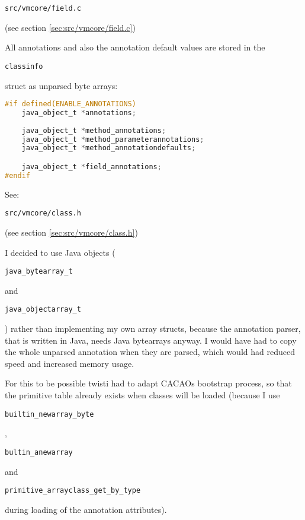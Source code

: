 \documentclass[a4paper, 10pt, titlepage]{scrartcl} %
\begin{document}
\begin{scriptsize}\verb|src|\hspace{0.0pt}\verb|/|\hspace{0.0pt}\verb|vmcore|\hspace{0.0pt}\verb|/|\hspace{0.0pt}\verb|field|\hspace{0.0pt}\verb|.|\hspace{0.0pt}\verb|c|\end{scriptsize} (see section \ref{sec:src/vmcore/field.c})

All annotations and also the annotation default values are stored in the
\begin{scriptsize}\verb|classinfo|\end{scriptsize} struct as unparsed byte arrays:
\begin{lstlisting}[language=C,firstnumber=147]
#if defined(ENABLE_ANNOTATIONS)
	java_object_t *annotations;
	
	java_object_t *method_annotations;
	java_object_t *method_parameterannotations;
	java_object_t *method_annotationdefaults;

	java_object_t *field_annotations;
#endif
\end{lstlisting}
See: \begin{scriptsize}\verb|src|\hspace{0.0pt}\verb|/|\hspace{0.0pt}\verb|vmcore|\hspace{0.0pt}\verb|/|\hspace{0.0pt}\verb|class|\hspace{0.0pt}\verb|.|\hspace{0.0pt}\verb|h|\end{scriptsize} (see section \ref{sec:src/vmcore/class.h})

I decided to use Java objects (\begin{scriptsize}\verb|java_bytearray_t|\end{scriptsize} and \begin{scriptsize}\verb|java_objectarray_t|\end{scriptsize})
rather than implementing my own array structs, because the annotation
parser, that is written in Java, needs Java bytearrays anyway. I would have had
to copy the whole unparsed annotation when they are parsed, which would had
reduced speed and increased memory usage.

For this to be possible twisti had to adapt CACAOs bootstrap process, so that
the primitive table already exists when classes will be loaded (because I use
\begin{scriptsize}\verb|builtin_newarray_byte|\end{scriptsize}, \begin{scriptsize}\verb|bultin_anewarray|\end{scriptsize} and
\begin{scriptsize}\verb|primitive_arrayclass_get_by_type|\end{scriptsize} during loading of the annotation
attributes).
\end{document}
